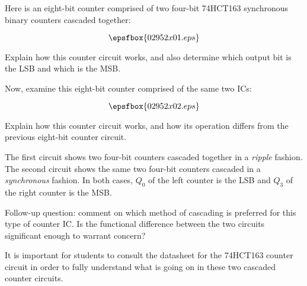 

Here is an eight-bit counter comprised of two four-bit 74HCT163 synchronous binary counters cascaded together:

$$\epsfbox{02952x01.eps}$$

Explain how this counter circuit works, and also determine which output bit is the LSB and which is the MSB.

\vskip 10pt

Now, examine this eight-bit counter comprised of the same two ICs:

$$\epsfbox{02952x02.eps}$$

Explain how this counter circuit works, and how its operation differs from the previous eight-bit counter circuit.







The first circuit shows two four-bit counters cascaded together in a {\it ripple} fashion.  The second circuit shows the same two four-bit counters cascaded in a {\it synchronous} fashion.  In both cases, $Q_0$ of the left counter is the LSB and $Q_3$ of the right counter is the MSB.

\vskip 10pt

Follow-up question: comment on which method of cascading is preferred for this type of counter IC.  Is the functional difference between the two circuits significant enough to warrant concern?







It is important for students to consult the datasheet for the 74HCT163 counter circuit in order to fully understand what is going on in these two cascaded counter circuits.  




